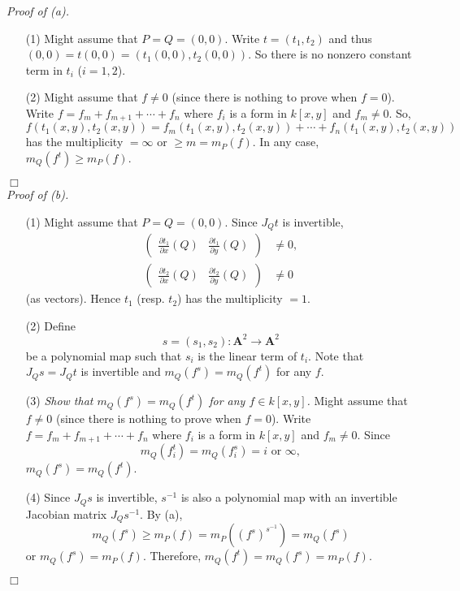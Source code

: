 \documentclass{article}
\begin{document}
\emph{Proof of (a).}
\begin{enumerate}
\item[(1)]
  Might assume that $P = Q = (0, 0)$.
  Write $t = (t_1, t_2)$ and thus $(0,0) = t(0,0) = (t_1(0,0), t_2(0,0))$.
  So there is no nonzero constant term in $t_i$ ($i = 1, 2$).

\item[(2)]
  Might assume that $f \neq 0$ (since there is nothing to prove when $f = 0$).
  Write $f = f_m + f_{m+1} + \cdots + f_n$ where $f_i$ is a form in $k[x,y]$
  and $f_m \neq 0$.
  So,
  \[
    f(t_1(x,y),t_2(x,y))
    = f_m(t_1(x,y),t_2(x,y)) + \cdots + f_n(t_1(x,y),t_2(x,y))
  \]
  has the multiplicity $= \infty$ or $\geq m = m_P(f)$.
  In any case, $m_Q(f^t) \geq m_P(f)$.

\end{enumerate}
$\Box$ \\



\emph{Proof of (b).}
\begin{enumerate}
\item[(1)]
  Might assume that $P = Q = (0, 0)$.
  Since $J_Qt$ is invertible,
  \begin{align*}
    \begin{pmatrix}
      \frac{\partial t_1}{\partial x}(Q) & \frac{\partial t_1}{\partial y}(Q)
    \end{pmatrix}
    &\neq 0, \\
    \begin{pmatrix}
      \frac{\partial t_2}{\partial x}(Q) & \frac{\partial t_2}{\partial y}(Q)
    \end{pmatrix}
    &\neq 0
  \end{align*}
  (as vectors).
  Hence $t_1$ (resp. $t_2$) has the multiplicity $= 1$.

\item[(2)]
  Define
  \[
    s = (s_1, s_2): \mathbf{A}^2 \to \mathbf{A}^2
  \] be a polynomial map such that $s_i$ is the linear term of $t_i$.
  Note that $J_Q{s} = J_Q{t}$ is invertible and $m_Q(f^s) = m_Q(f^t)$ for any $f$.

\item[(3)]
  \emph{Show that $m_Q(f^s) = m_Q(f^t)$ for any $f \in k[x,y]$.}
  Might assume that $f \neq 0$ (since there is nothing to prove when $f = 0$).
  Write $f = f_m + f_{m+1} + \cdots + f_n$ where $f_i$ is a form in $k[x,y]$
  and $f_m \neq 0$.
  Since
  \[
    m_{Q}(f_i^t) = m_{Q}(f_i^s) = i \text{ or } \infty,
  \]
  $m_Q(f^s) = m_Q(f^t)$.

\item[(4)]
  Since $J_Q{s}$ is invertible,
  $s^{-1}$ is also a polynomial map with an invertible Jacobian matrix $J_Q{s^{-1}}$.
  By (a),
  \[
    m_Q(f^s) \geq m_P(f) = m_P((f^s)^{s^{-1}}) = m_Q(f^s)
  \]
  or $m_Q(f^s) = m_P(f)$.
  Therefore, $m_Q(f^t) = m_Q(f^s) = m_P(f)$.
\end{enumerate}
$\Box$ \\
\end{document}

